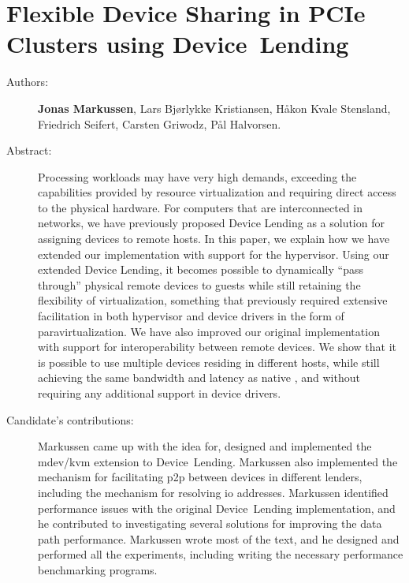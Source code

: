 \chapter{Flexible Device Sharing in PCIe Clusters using Device~Lending}
\label{paper:srmpds}
\paperthumb

\begin{description}
	\item[Authors:]
		\textbf{Jonas Markussen}, Lars Bj{\o}rlykke Kristiansen, H{\aa}kon Kvale Stensland,
		Friedrich Seifert, Carsten Griwodz, P{\aa}l Halvorsen.

	\item[Abstract:]
		Processing workloads may have very high  demands, exceeding the capabilities provided by resource
		virtualization and requiring direct access to the physical hardware.
		For computers that are interconnected in  networks, we have previously proposed 
		Device Lending as a solution for assigning devices to remote hosts. In this paper, we
		explain how we have extended our implementation with support for the  \gls{hypervisor}.
		Using our extended Device Lending, it becomes possible to dynamically ``pass through'' physical remote devices
        to  guests while still retaining the flexibility of virtualization, something that previously required
		extensive facilitation in both \gls{hypervisor} and device drivers in the form of \gls{paravirtualization}.
		We have also improved our original implementation with support for interoperability between remote devices.
		We show that it is possible to use multiple devices residing in different hosts, while still achieving the same
		bandwidth and latency as native , and without requiring any additional support in device drivers. 


	\item[Candidate's contributions:]
        Markussen came up with the idea for, designed and implemented the \gls{mdev}/\gls{kvm} extension to Device~Lending.
		Markussen also implemented the mechanism for facilitating \gls{p2p} between devices in different lenders,
		including the mechanism for resolving \gls{io} addresses.
		Markussen identified performance issues with the original Device~Lending implementation, 
		and he contributed to investigating several solutions for improving the data path performance.
		Markussen wrote most of the text, and he designed and performed all the experiments, including writing the necessary performance benchmarking programs.


\end{description}
